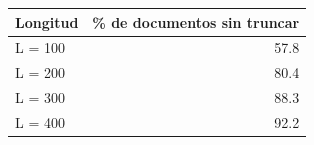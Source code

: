 \begin{tabular}{lr}
\toprule
Longitud & \% de documentos sin truncar \\
\midrule
L = 100 & 57.8 \\
L = 200 & 80.4 \\
L = 300 & 88.3 \\
L = 400 & 92.2 \\
\bottomrule
\end{tabular}
